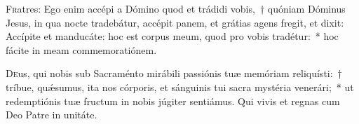 \documentclass[vesperale_romanum.tex]{subfiles}
\begin{document}

 \label{1_vesperis_cc}







 
 

\label{115_3a2} 

\label{127_4E} 

\label{147_5} 

\capitulum


\lettrine{F}{r}atres: Ego enim accépi a Dómino quod et trádidi vobis,~† quóniam Dóminus Jesus, in qua nocte tradebátur, accépit panem, et grátias agens fregit, et dixit: Accípite et manducáte: hoc est corpus meum, quod pro vobis tradétur:~* hoc fácite in meam commemoratiónem.

 \label{hy_pange_lingua_corpus_christi_solesmes}




\admagnificat


\oratio \label{or_corpus_christi}

\lettrine{D}{e}us, qui nobis sub Sacraménto mirábili passiónis tuæ memóriam reliquísti:~† tríbue, quǽsumus, ita nos córporis, et sánguinis tui sacra mystéria venerári;~* ut redemptiónis tuæ fructum in nobis júgiter sentiámus. Qui vivis et regnas cum Deo Patre in unitáte.
\end{document}
